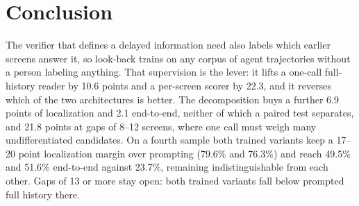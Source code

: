\section{Conclusion}
The verifier that defines a delayed information need also labels which earlier screens answer it, so look-back trains on any corpus of agent trajectories without a person labeling anything. That supervision is the lever: it lifts a one-call full-history reader by 10.6 points and a per-screen scorer by 22.3, and it reverses which of the two architectures is better. The decomposition buys a further 6.9 points of localization and 2.1 end-to-end, neither of which a paired test separates, and 21.8 points at gaps of 8--12 screens, where one call must weigh many undifferentiated candidates. On a fourth sample both trained variants keep a 17--20 point localization margin over prompting (79.6\% and 76.3\%) and reach 49.5\% and 51.6\% end-to-end against 23.7\%, remaining indistinguishable from each other. Gaps of 13 or more stay open: both trained variants fall below prompted full history there.
